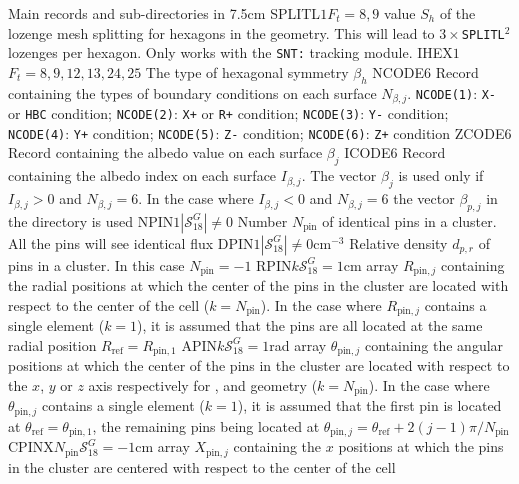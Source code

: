 \begin{DescriptionEnregistrement}{Main records and sub-directories in }{7.5cm}
\OptIntEnr
  {SPLITL}{$1$}{$F_{t}=8,9$}
  {value $S_{h}$ of the lozenge mesh splitting for hexagons in the geometry. This will lead to $3 \times${\tt SPLITL}$^2$ lozenges per hexagon. Only works with the {\tt SNT:} tracking module.}
\OptIntEnr
  {IHEX}{$1$}{$F_{t}= 8,9,12,13,24,25$}
  {The type of hexagonal symmetry $\beta_{h}$}
\IntEnr
  {NCODE}{$6$}
  {Record containing the types of boundary conditions on each surface
  $N_{\beta,j}$. {\tt NCODE(1)}: {\tt X-} or {\tt HBC} condition;
  {\tt NCODE(2)}: {\tt X+} or {\tt R+} condition; {\tt NCODE(3)}: {\tt Y-}
  condition; {\tt NCODE(4)}: {\tt Y+} condition; {\tt NCODE(5)}: {\tt Z-}
  condition; {\tt NCODE(6)}: {\tt Z+} condition}
\RealEnr
  {ZCODE}{$6$}{}
  {Record containing the albedo value on each surface $\beta_{j}$}
\IntEnr
  {ICODE}{$6$}
  {Record containing the albedo index on each surface $I_{\beta,j}$. 
   The vector $\beta_{j}$ is used only if $I_{\beta,j}>0$ and $N_{\beta,j}=6$. In the case where
   $I_{\beta,j}<0$ and $N_{\beta,j}=6$ the
   vector $\beta_{p,j}$ in the directory  is used} 
\OptIntEnr
  {NPIN}{$1$}{$|\mathcal{S}^{G}_{18}|\ne 0$}
  {Number $N_{\text{pin}}$ of identical pins in a cluster. All the pins will see identical flux}
\OptRealEnr
  {DPIN}{$1$}{$|\mathcal{S}^{G}_{18}|\ne 0$}{cm$^{-3}$}
  {Relative density $d_{p,r}$ of pins in a cluster. In this case $N_{\text{pin}}=-1$}
\OptRealEnr
  {RPIN}{$k$}{$\mathcal{S}^{G}_{18}=1$}{cm}
  {array $R_{\text{pin},j}$ containing the radial positions at which the center of the pins in the cluster are located with respect to the center of the cell ($k=N_{\text{pin}}$). In the case where
   $R_{\text{pin},j}$ contains a single element ($k=1$), it is assumed that the pins are all located at the same radial position $R_{\text{ref}}=R_{\text{pin},1}$}
\OptRealEnr
  {APIN}{$k$}{$\mathcal{S}^{G}_{18}=1$}{rad}
  {array $\theta_{\text{pin},j}$ containing the angular positions at which the center of the pins in the cluster are located with respect to the $x$, $y$ or $z$ axis
respectively for ,  and  geometry ($k=N_{\text{pin}}$). In the case where
   $\theta_{\text{pin},j}$ contains a single element ($k=1$), it is assumed that the first pin is located at $\theta_{\text{ref}}=\theta_{\text{pin},1}$, the remaining pins being located at
$\theta_{\text{pin},j}=\theta_{\text{ref}}+2(j-1)\pi/N_{\text{pin}}$}
\OptRealEnr
  {CPINX}{$N_{\text{pin}}$}{$\mathcal{S}^{G}_{18}=-1$}{cm}
  {array $X_{\text{pin},j}$ containing the $x$ positions at which the pins in the cluster are centered with respect to the center of the cell}

\end{DescriptionEnregistrement}
